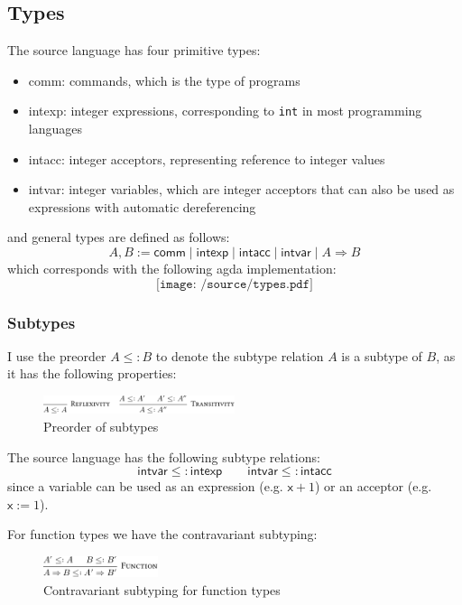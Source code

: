 \documentclass[12pt,a4paper]{report}
\theoremstyle{definition}
\begin{document}
        \subsection{Types}
        The source language has four primitive types:
        \begin{itemize}
            \item 
                \textsf{comm}: commands, which is the type of programs
            \item 
                \textsf{intexp}: integer expressions, corresponding to \texttt{int} in most programming languages
            \item 
                \textsf{intacc}: integer acceptors, representing reference to integer values
            \item 
                \textsf{intvar}: integer variables, which are integer acceptors that can also be used as expressions with automatic dereferencing
        \end{itemize}
        and general types are defined as follows: 
        \[ A, B := \textsf{comm} \mid \textsf{intexp} \mid \textsf{intacc} \mid \textsf{intvar} \mid A \Rightarrow B \] 
        which corresponds with the following agda implementation:
        \[\texttt{[image: /source/types.pdf]}\]

        \subsubsection{Subtypes}
        I use the preorder $A ≤: B$ to denote the subtype relation $A$ is a subtype of $B$, as it has the following properties:
        \begin{figure}[H]
            \centering
            \includegraphics[width=0.5\textwidth]{subtype.pdf}
            \caption{Preorder of subtypes}
            \label{fig: subtype}
        \end{figure}

        The source language has the following subtype relations:
        \[ \textsf{intvar} \leq: \textsf{intexp} \qquad \textsf{intvar} \leq: \textsf{intacc} \]
        since a variable can be used as an expression (e.g. $\mathsf{x} + 1$) or an acceptor (e.g. $\mathsf{x} := 1$).

        For function types we have the contravariant subtyping:
        \begin{figure}[H]
            \centering
            \includegraphics[width=0.3\textwidth]{subtype_function.pdf}
            \caption{Contravariant subtyping for function types}
            \label{fig: subtype_fun}
        \end{figure}
        
\end{document}
